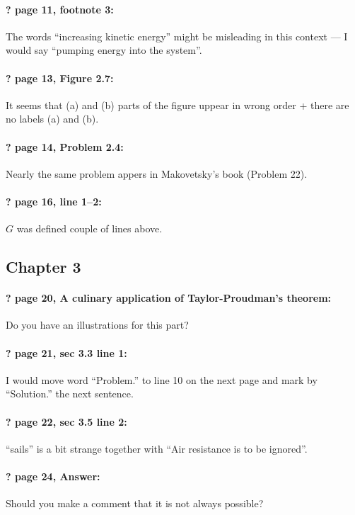 \documentclass[twoside]{article}
\begin{document}
\paragraph{? page 11, footnote 3:} The words ``increasing kinetic energy'' might be misleading in this context --- I would say ``pumping energy into the system''.

\paragraph{? page 13, Figure 2.7:} It seems that (a) and (b) parts of the figure uppear in wrong order + there are no labels (a) and (b).

\paragraph{? page 14, Problem 2.4:} Nearly the same problem appers in Makovetsky’s book (Problem 22).

\paragraph{? page 16, line 1--2:} $G$ was defined couple of lines above.

\subsection*{Chapter 3}

\paragraph{? page 20, A culinary application of Taylor-Proudman’s theorem:} Do you have an illustrations for this part?

\paragraph{? page 21, sec 3.3 line 1:} I would move word ``Problem.'' to line 10 on the next page and  mark by ``Solution.'' the next sentence.

\paragraph{? page 22, sec 3.5 line 2:} ``sails'' is a bit strange together with ``Air resistance
is to be ignored''.

\paragraph{? page 24, Answer:} Should you make a comment that it is not always possible?
\end{document}
